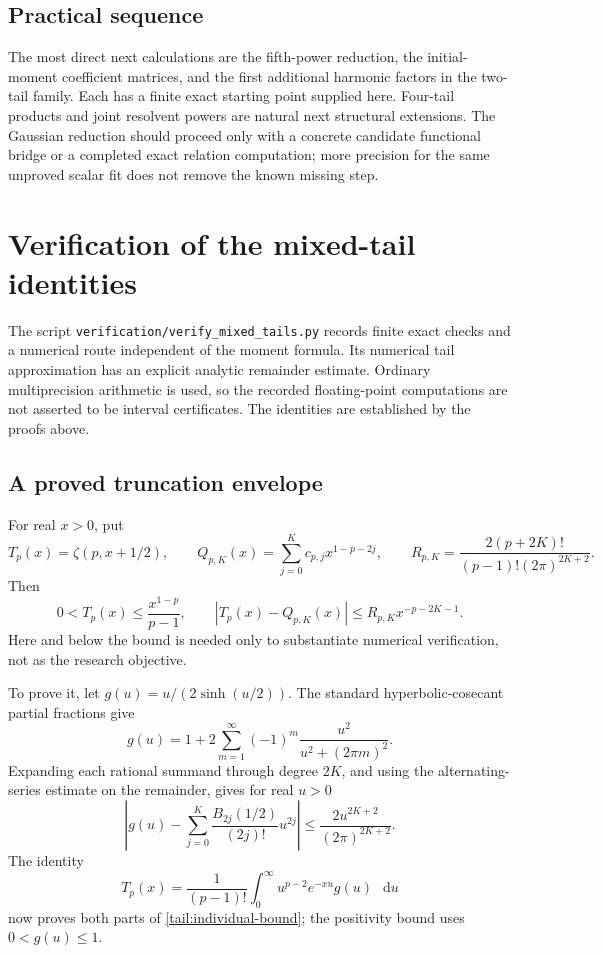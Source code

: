 \documentclass[11pt,a4paper]{article}
\numberwithin{equation}{section}
\theoremstyle{definition}
\theoremstyle{remark}
\newcommand{\dd}{\mathop{}\!\mathrm{d}}
\begin{document}
\subsection{Practical sequence}

The most direct next calculations are the fifth-power reduction,
the initial-moment coefficient matrices, and the first additional
harmonic factors in the two-tail family. Each has a finite exact
starting point supplied here. Four-tail products and joint
resolvent powers are natural next structural extensions. The
Gaussian reduction should proceed only with a concrete candidate
functional bridge or a completed exact relation computation;
more precision for the same unproved scalar fit does not remove
the known missing step.



\appendix

\section{Verification of the mixed-tail identities}
\label{tail:verification-section}

The script \texttt{verification/verify\_mixed\_tails.py} records
finite exact checks and a numerical route independent of the moment
formula. Its numerical tail approximation has an explicit analytic
remainder estimate. Ordinary multiprecision arithmetic is used, so
the recorded floating-point computations are not asserted to be
interval certificates. The identities are established by the
proofs above.

\subsection{A proved truncation envelope}

For real \(x>0\), put
\[
 T_p(x)=\zeta(p,x+1/2),\qquad
 Q_{p,K}(x)=\sum_{j=0}^{K}c_{p,j}x^{1-p-2j},\qquad
 R_{p,K}=\frac{2(p+2K)!}{(p-1)!(2\pi)^{2K+2}}.
\]
Then
\begin{equation}\label{tail:individual-bound}
 0<T_p(x)\le\frac{x^{1-p}}{p-1},\qquad
 |T_p(x)-Q_{p,K}(x)|\le R_{p,K}x^{-p-2K-1}.
\end{equation}
Here and below the bound is needed only to substantiate numerical
verification, not as the research objective.

To prove it, let \(g(u)=u/(2\sinh(u/2))\). The standard
hyperbolic-cosecant partial fractions \cite[Eq.~4.36.5]{DLMF}
give
\[
 g(u)=1+2\sum_{m=1}^{\infty}
             (-1)^m\frac{u^2}{u^2+(2\pi m)^2}.
\]
Expanding each rational summand through degree \(2K\), and using
the alternating-series estimate on the remainder, gives for real
\(u>0\)
\[
 \left|g(u)-\sum_{j=0}^{K}
        \frac{B_{2j}(1/2)}{(2j)!}u^{2j}\right|
 \le\frac{2u^{2K+2}}{(2\pi)^{2K+2}}.
\]
The identity
\[
 T_p(x)=\frac1{(p-1)!}\int_0^{\infty}
             u^{p-2}e^{-xu}g(u)\,\dd u
\]
now proves both parts of \eqref{tail:individual-bound}; the
positivity bound uses \(0<g(u)\le1\).
\end{document}

